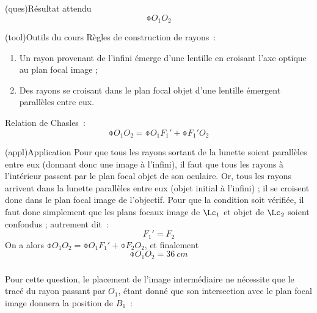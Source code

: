 \documentclass[../../main/main.tex]{subfiles}
\begin{document}
{	\begin{tcbraster}[raster columns=7, raster equal height=rows]
		\begin{tcolorbox}[blankest, raster multicolumn=3, space to=\myspac]
			\begin{tcbraster}[raster columns=1]
				\begin{tcb}[](ques){Résultat attendu}
					$$\obar{O_1O_2}$$
				\end{tcb}
				\begin{tcb}[add to natural height=\myspac](tool){Outils du cours}
					Règles de construction de rayons~:
					\begin{enumerate}
						\item Un rayon provenant de l'infini émerge d'une lentille en croisant
						      l'axe optique au plan focal image ;
						\item Des rayons se croisant dans le plan focal objet d'une lentille
						      émergent parallèles entre eux.
					\end{enumerate}
					Relation de Chasles~:
					\[ \obar{O_1O_2} = \obar{O_1F_1'} + \obar{F_1'O_2} \]
				\end{tcb}
			\end{tcbraster}
		\end{tcolorbox}
		\begin{tcb}[raster multicolumn=4](appl){Application}
			Pour que tous les rayons sortant de la lunette soient parallèles entre eux
			(donnant donc une image à l'infini), il faut que tous les rayons à
			l'intérieur passent par le plan focal objet de son oculaire.\bigbreak
			Or, tous les rayons arrivent dans la lunette parallèles entre eux (objet
			initial à l'infini) ; il se croisent donc dans le plan focal image de
			l'objectif. \bigbreak
			Pour que la condition soit vérifiée, il faut donc simplement que les plans
			focaux image de $\Lc_1$ et objet de $\Lc_2$ soient confondus ; autrement dit~:
			\[ \boxed{F_1' = F_2} \]
			On a alors $\obar{O_1O_2} = \obar{O_1F_1'} + \obar{F_2O_2}$, et finalement
			\[ \boxed{\obar{O_1O_2} = \SI{+36}{cm}} \]
		\end{tcb}
	\end{tcbraster}

	\subsubsection{}
	Pour cette question, le placement de l'image intermédiaire ne nécessite que le
	tracé du rayon passant par $O_1$, étant donné que son intersection avec le plan
	focal image donnera la position de $B_1$~:

}
\end{document}
